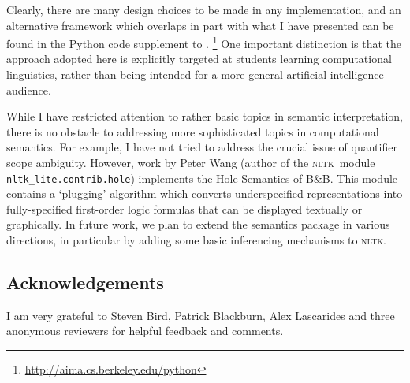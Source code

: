 \documentclass[11pt]{article}
\newcommand{\prog}[1]{\textsf{#1}}
\newcommand{\bnb}{B\&B}
\newcommand{\nltk}{\textsc{nltk}}
\begin{document}
Clearly, there are many design choices to be made in any
implementation, and an alternative framework which overlaps in part
with what I have presented can be found in the Python code
supplement to \cite{Russell:2003:AIMA}.%
\footnote{\url{http://aima.cs.berkeley.edu/python}}
One important distinction is that the approach adopted here is
explicitly targeted at students learning computational linguistics,
rather than being intended for a more general artificial intelligence
audience. 

While I have restricted attention to rather basic topics in semantic
interpretation, there is no obstacle to addressing more sophisticated
topics in computational semantics. For example, I have not tried to
address the crucial issue of quantifier scope ambiguity. However, work
by Peter Wang (author of the \nltk\ module
\verb!nltk_lite.contrib.hole!)  implements the Hole Semantics of
\bnb. This module contains a `plugging' algorithm which converts
underspecified representations into fully-specified first-order logic
formulas that can be displayed textually or graphically. In future
work, we plan to extend the \prog{semantics} package in various
directions, in particular by adding some basic inferencing mechanisms
to \nltk.

\subsection*{Acknowledgements}
I am very grateful to Steven Bird, Patrick Blackburn, Alex Lascarides and
three anonymous reviewers for helpful feedback and comments.



\end{document}
